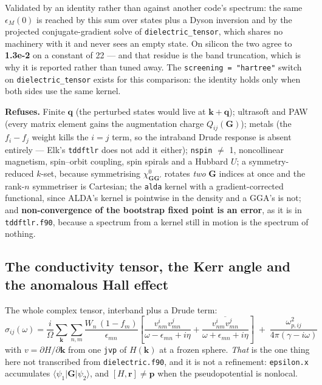 \documentclass[11pt,a4paper]{article}
\newcommand{\code}[1]{\texttt{\small #1}}
\begin{document}
Validated by an identity rather than against another code's spectrum: the same
$\epsilon_M(0)$ is reached by this sum over states plus a Dyson inversion and by
the projected conjugate-gradient solve of \code{dielectric\_tensor}, which
shares no machinery with it and never sees an empty state. On silicon the two
agree to \textbf{1.3e-2} on a constant of 22 --- and that residue is the band
truncation, which is why it is reported rather than tuned away. The
\code{screening = "hartree"} switch on \code{dielectric\_tensor} exists for
this comparison: the identity holds only when both sides use the same kernel.

\begin{refuses}
\textbf{Refuses.} Finite $\mathbf q$ (the perturbed states would live at
$\mathbf k + \mathbf q$); ultrasoft and PAW (every matrix element gains the
augmentation charge $Q_{ij}(\mathbf G)$); metals (the $f_i - f_j$ weight kills
the $i=j$ term, so the intraband Drude response is absent entirely --- Elk's
\code{tddftlr} does not add it either); \code{nspin} $\neq$ 1, noncollinear
magnetism, spin--orbit coupling, spin spirals and a Hubbard $U$; a
symmetry-reduced $k$-set, because symmetrising $\chi^0_{\mathbf{GG}'}$ rotates
\emph{two} $\mathbf G$ indices at once and the rank-$n$ symmetriser is
Cartesian; the \code{alda} kernel with a gradient-corrected functional, since
ALDA's kernel is pointwise in the density and a GGA's is not; and
\textbf{non-convergence of the bootstrap fixed point is an error}, as it is in
\code{tddftlr.f90}, because a spectrum from a kernel still in motion is the
spectrum of nothing.
\end{refuses}

\subsection{The conductivity tensor, the Kerr angle and the anomalous Hall effect}

The whole complex tensor, interband plus a Drude term:
\begin{equation*}
\sigma_{ij}(\omega) = \frac{i}{\Omega}\sum_{\mathbf k}\sum_{n,m}
  \frac{W_n\,(1-f_m)}{\epsilon_{mn}}
  \left[\frac{v^i_{nm}v^j_{mn}}{\omega-\epsilon_{mn}+i\eta}
      + \frac{\overline{v^i_{nm}v^j_{mn}}}{\omega+\epsilon_{mn}+i\eta}\right]
  \;+\; \frac{\omega_{p,ij}^2}{4\pi(\gamma - i\omega)}
\end{equation*}
with $v = \partial H/\partial\mathbf k$ from one \code{jvp} of $H(\mathbf k)$ at
a frozen sphere. \emph{That} is the one thing here not transcribed from
\code{dielectric.f90}, and it is not a refinement: \code{epsilon.x} accumulates
$\langle\psi_1|\mathbf G|\psi_2\rangle$, and $[H,\mathbf r]\neq\mathbf p$ when
the pseudopotential is nonlocal.
\end{document}
